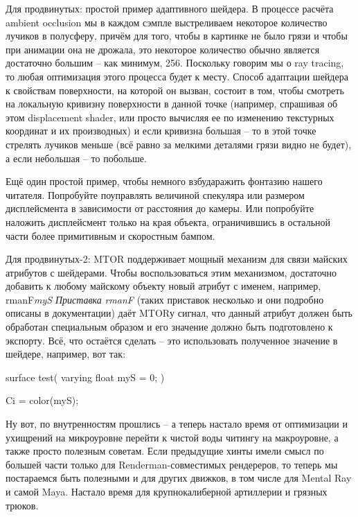  Для
    продвинутых: простой пример
    адаптивного шейдера. В процессе расчёта ambient occlusion мы в
    каждом сэмпле выстреливаем некоторое количество лучиков в
    полусферу, причём для того, чтобы в картинке не было грязи и чтобы
    при анимации она не дрожала, это некоторое количество обычно
    является достаточно большим – как минимум, 256. Поскольку говорим
    мы о ray tracing, то любая оптимизация этого процесса будет к
    месту. Способ адаптации шейдера к свойствам поверхности, на которой
    он вызван, состоит в том, чтобы смотреть на локальную кривизну
    поверхности в данной точке (например, спрашивая об этом
    displacement shader, или просто вычисляя ее по изменению текстурных
    координат и их производных) и если кривизна большая – то в этой
    точке стрелять лучиков меньше (всё равно за мелкими деталями грязи
    видно не будет), а если небольшая – то побольше.
  

 Ещё один
    простой пример, чтобы немного взбударажить фонтазию нашего
    читателя. Попробуйте поуправлять величиной спекуляра или размером
    дисплейсмента в зависимости от расстояния до камеры. Или попробуйте
    наложить дисплейсмент только на края объекта, ограничившись в
    остальной части более примитивным и скоростным
    бампом.
  

 Для
    продвинутых-2: MTOR поддерживает
    мощный механизм для связи майских атрибутов с шейдерами. Чтобы
    воспользоваться этим механизмом, достаточно добавить к любому
    майскому объекту новый атрибут с именем, например, rmanF{\it myS} {\it  }{\it Приставка} {\it rmanF} (таких приставок
    несколько и они подробно описаны в документации) даёт MTORу сигнал, что
    данный атрибут должен быть обработан специальным образом и его
    значение должно быть подготовлено к экспорту. Всё, что остаётся
    сделать – это использовать полученное значение в шейдере, например,
    вот так:
  
surface test( varying float myS = 0; )

  
{
  
  
   Ci = color(myS);

  
}

  

 Ну вот, по внутренностям прошлись – а теперь
    настало время от оптимизации и ухищрений на микроуровне перейти к
    чистой воды читингу на макроуровне, а также просто полезным
    советам. Если предыдущие хинты имели смысл по большей части только
    для Renderman-совместимых рендереров, то теперь мы постараемся быть
    полезными и для других движков, в том числе для Mental Ray и самой
    Maya. Настало время для крупнокалиберной артиллерии и грязных
    трюков.

